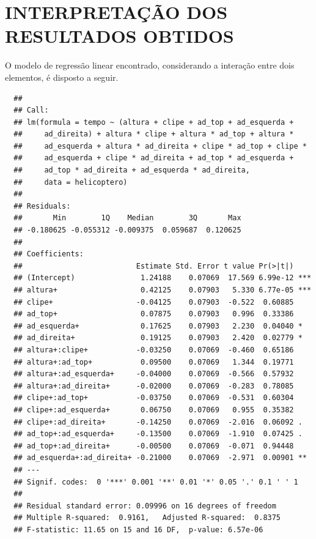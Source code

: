 \chapter{INTERPRETAÇÃO DOS RESULTADOS OBTIDOS}
\label{chap:resultados}
O modelo de regressão linear encontrado, considerando a interação entre dois elementos, é disposto a seguir.

\begin{knitrout}
  \color{fgcolor}\begin{kframe}
  \begin{verbatim}
  ## 
  ## Call:
  ## lm(formula = tempo ~ (altura + clipe + ad_top + ad_esquerda + 
  ##     ad_direita) + altura * clipe + altura * ad_top + altura * 
  ##     ad_esquerda + altura * ad_direita + clipe * ad_top + clipe * 
  ##     ad_esquerda + clipe * ad_direita + ad_top * ad_esquerda + 
  ##     ad_top * ad_direita + ad_esquerda * ad_direita,
  ##     data = helicoptero)
  ## 
  ## Residuals:
  ##       Min        1Q    Median        3Q       Max 
  ## -0.180625 -0.055312 -0.009375  0.059687  0.120625 
  ## 
  ## Coefficients:
  ##                          Estimate Std. Error t value Pr(>|t|)    
  ## (Intercept)               1.24188    0.07069  17.569 6.99e-12 ***
  ## altura+                   0.42125    0.07903   5.330 6.77e-05 ***
  ## clipe+                   -0.04125    0.07903  -0.522  0.60885    
  ## ad_top+                   0.07875    0.07903   0.996  0.33386    
  ## ad_esquerda+              0.17625    0.07903   2.230  0.04040 *  
  ## ad_direita+               0.19125    0.07903   2.420  0.02779 *  
  ## altura+:clipe+           -0.03250    0.07069  -0.460  0.65186    
  ## altura+:ad_top+           0.09500    0.07069   1.344  0.19771    
  ## altura+:ad_esquerda+     -0.04000    0.07069  -0.566  0.57932    
  ## altura+:ad_direita+      -0.02000    0.07069  -0.283  0.78085    
  ## clipe+:ad_top+           -0.03750    0.07069  -0.531  0.60304    
  ## clipe+:ad_esquerda+       0.06750    0.07069   0.955  0.35382    
  ## clipe+:ad_direita+       -0.14250    0.07069  -2.016  0.06092 .  
  ## ad_top+:ad_esquerda+     -0.13500    0.07069  -1.910  0.07425 .  
  ## ad_top+:ad_direita+      -0.00500    0.07069  -0.071  0.94448    
  ## ad_esquerda+:ad_direita+ -0.21000    0.07069  -2.971  0.00901 ** 
  ## ---
  ## Signif. codes:  0 '***' 0.001 '**' 0.01 '*' 0.05 '.' 0.1 ' ' 1
  ## 
  ## Residual standard error: 0.09996 on 16 degrees of freedom
  ## Multiple R-squared:  0.9161,	Adjusted R-squared:  0.8375 
  ## F-statistic: 11.65 on 15 and 16 DF,  p-value: 6.57e-06
  \end{verbatim}
  \end{kframe}
  \end{knitrout}

